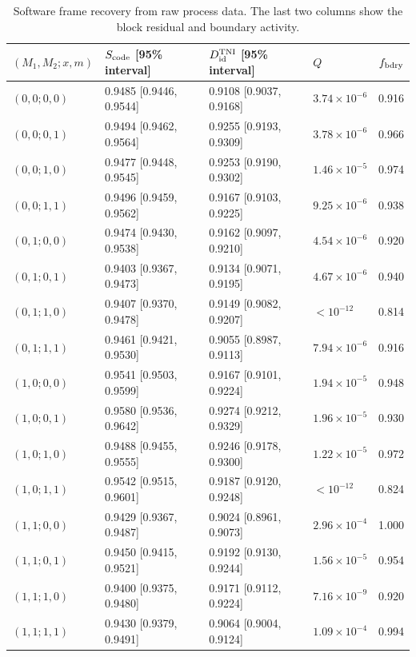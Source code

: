 \documentclass[10pt,a4paper]{article}
\begin{document}
\par\begin{table}[htbp]\centering\footnotesize
\caption{Software frame recovery from raw process data. The last two columns show the block residual and boundary activity.}\label{stab:process_frame_tracked}
\begin{tabular}{llllr}\toprule
$(M_1,M_2;x,m)$ & $S_{\rm code}$ [95\% interval] & $D_{\rm id}^{\rm TNI}$ [95\% interval] & $Q$ & $f_{\rm bdry}$\\\midrule
$(0,0;0,0)$ & 0.9485 [0.9446, 0.9544] & 0.9108 [0.9037, 0.9168] & $3.74\times10^{-6}$ & 0.916 \\
$(0,0;0,1)$ & 0.9494 [0.9462, 0.9564] & 0.9255 [0.9193, 0.9309] & $3.78\times10^{-6}$ & 0.966 \\
$(0,0;1,0)$ & 0.9477 [0.9448, 0.9545] & 0.9253 [0.9190, 0.9302] & $1.46\times10^{-5}$ & 0.974 \\
$(0,0;1,1)$ & 0.9496 [0.9459, 0.9562] & 0.9167 [0.9103, 0.9225] & $9.25\times10^{-6}$ & 0.938 \\
$(0,1;0,0)$ & 0.9474 [0.9430, 0.9538] & 0.9162 [0.9097, 0.9210] & $4.54\times10^{-6}$ & 0.920 \\
$(0,1;0,1)$ & 0.9403 [0.9367, 0.9473] & 0.9134 [0.9071, 0.9195] & $4.67\times10^{-6}$ & 0.940 \\
$(0,1;1,0)$ & 0.9407 [0.9370, 0.9478] & 0.9149 [0.9082, 0.9207] & $<10^{-12}$ & 0.814 \\
$(0,1;1,1)$ & 0.9461 [0.9421, 0.9530] & 0.9055 [0.8987, 0.9113] & $7.94\times10^{-6}$ & 0.916 \\
$(1,0;0,0)$ & 0.9541 [0.9503, 0.9599] & 0.9167 [0.9101, 0.9224] & $1.94\times10^{-5}$ & 0.948 \\
$(1,0;0,1)$ & 0.9580 [0.9536, 0.9642] & 0.9274 [0.9212, 0.9329] & $1.96\times10^{-5}$ & 0.930 \\
$(1,0;1,0)$ & 0.9488 [0.9455, 0.9555] & 0.9246 [0.9178, 0.9300] & $1.22\times10^{-5}$ & 0.972 \\
$(1,0;1,1)$ & 0.9542 [0.9515, 0.9601] & 0.9187 [0.9120, 0.9248] & $<10^{-12}$ & 0.824 \\
$(1,1;0,0)$ & 0.9429 [0.9367, 0.9487] & 0.9024 [0.8961, 0.9073] & $2.96\times10^{-4}$ & 1.000 \\
$(1,1;0,1)$ & 0.9450 [0.9415, 0.9521] & 0.9192 [0.9130, 0.9244] & $1.56\times10^{-5}$ & 0.954 \\
$(1,1;1,0)$ & 0.9400 [0.9375, 0.9480] & 0.9171 [0.9112, 0.9224] & $7.16\times10^{-9}$ & 0.920 \\
$(1,1;1,1)$ & 0.9430 [0.9379, 0.9491] & 0.9064 [0.9004, 0.9124] & $1.09\times10^{-4}$ & 0.994 \\
\bottomrule\end{tabular}\end{table}\par
\end{document}
